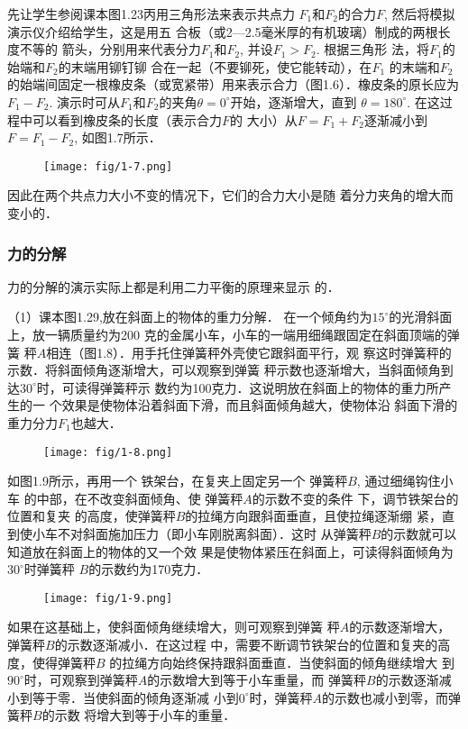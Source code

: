 先让学生参阅课本图1.23丙用三角形法来表示共点力
$F_1$和$F_2$的合力$F$, 然后将模拟演示仪介绍给学生，这是用五
合板（或2—2.5毫米厚的有机玻璃）制成的两根长度不等的
箭头，分别用来代表分力$F_1$和$F_2$, 并设$F_1>F_2$. 根据三角形
法，将$F_1$的始端和$F_2$的末端用铆钉铆
合在一起（不要铆死，使它能转动），在$F_1$
的末端和$F_2$的始端间固定一根橡皮条（或宽紧带）用来表示合力（图1.6）．橡皮条的原长应为$F_1-F_2$. 演示时可从$F_1$和$F_2$的夹角$\theta=0^{\circ}$开始，逐渐增大，直到
$\theta=180^{\circ}$. 在这过程中可以看到橡皮条的长度（表示合力$F$的
大小）从$F=F_1+F_2$逐渐减小到$F=F_1-F_2$, 如图1.7所示．
\begin{figure}[htp]
    \centering
    \texttt{[image: fig/1-7.png]}
    \caption{}
\end{figure}
因此在两个共点力大小不变的情况下，它们的合力大小是随
着分力夹角的增大而变小的．

\subsubsection{力的分解}
力的分解的演示实际上都是利用二力平衡的原理来显示
的．

（1）课本图1.29,放在斜面上的物体的重力分解．
在一个倾角约为$15^{\circ}$的光滑斜面上，放一辆质量约为200
克的金属小车，小车的一端用细绳跟固定在斜面顶端的弹簧
秤$A$相连（图1.8）．用手托住弹簧秤外壳使它跟斜面平行，观
察这时弹簧秤的示数．将斜面倾角逐渐增大，可以观察到弹簧
秤示数也逐渐增大，当斜面倾角到达$30^{\circ}$时，可读得弹簧秤示
数约为100克力．这说明放在斜面上的物体的重力所产生的一
个效果是使物体沿着斜面下滑，而且斜面倾角越大，使物体沿
斜面下滑的重力分力$F_1$也越大．
\begin{figure}[htp]
    \centering
    \texttt{[image: fig/1-8.png]}
    \caption{}
\end{figure}

如图1.9所示，再用一个
铁架台，在复夹上固定另一个
弹簧秤$B$, 通过细绳钩住小车
的中部，在不改变斜面倾角、使
弹簧秤$A$的示数不变的条件
下，调节铁架台的位置和复夹
的高度，使弹簧秤$B$的拉绳方向跟斜面垂直，且使拉绳逐渐绷
紧，直到使小车不对斜面施加压力（即小车刚脱离斜面）．这时
从弹簧秤$B$的示数就可以知道放在斜面上的物体的又一个效
果是使物体紧压在斜面上，可读得斜面倾角为$30^{\circ}$时弹簧秤
$B$的示数约为170克力．
\begin{figure}[htp]
    \centering
    \texttt{[image: fig/1-9.png]}
    \caption{}
\end{figure}

如果在这基础上，使斜面倾角继续增大，则可观察到弹簧
秤$A$的示数逐渐增大，弹簧秤$B$的示数逐渐减小．在这过程
中，需要不断调节铁架台的位置和复夹的高度，使得弹簧秤$B$
的拉绳方向始终保持跟斜面垂直．当使斜面的倾角继续增大
到$90^{\circ}$时，可观察到弹簧秤$A$的示数增大到等于小车重量，而
弹簧秤$B$的示数逐渐减小到等于零．当使斜面的倾角逐渐减
小到$0^{\circ}$时，弹簧秤$A$的示数也减小到零，而弹簧秤$B$的示数
将增大到等于小车的重量．

